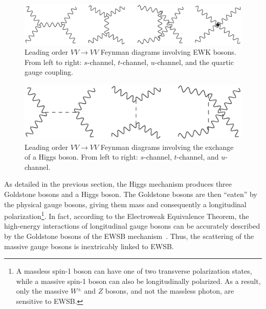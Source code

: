 \begin{figure}[htbp]
  \centering
  \includegraphics[height=.125\textheight]{figs/theory/vbs_ewk}
  \caption{Leading order $VV\rightarrow VV$ Feynman diagrams involving EWK bosons. From left to right: $s$-channel, $t$-channel, $u$-channel, and the quartic gauge coupling.}
  \label{fig:theory_vbs_ewk}
\end{figure}
\begin{figure}[htbp]
  \centering
  \includegraphics[height=.125\textheight]{figs/theory/vbs_higgs}
  \caption{Leading order $VV\rightarrow VV$ Feynman diagrams involving the exchange of a Higgs boson. From left to right: $s$-channel, $t$-channel, and $u$-channel.}
  \label{fig:theory_vbs_higgs}
\end{figure}

As detailed in the previous section, the Higgs mechanism produces three Goldstone bosons and a Higgs boson.
The Goldstone bosons are then ``eaten'' by the physical gauge bosons, giving them mass and consequently a longitudinal polarization\footnote{A massless spin-1 boson can have one of two transverse polarization states, while a massive spin-1 boson can also be longitudinally polarized.  As a result, only the massive $W^{\pm}$ and $Z$ bosons, and not the massless photon, are sensitive to EWSB.}.
In fact, according to the Electroweak Equivalence Theorem, the high-energy interactions of longitudinal gauge bosons can be accurately described by the Goldstone bosons of the EWSB mechanism~\cite{1997.ewk-equivalence}.
Thus, the scattering of the massive gauge bosons is inextricably linked to EWSB.

